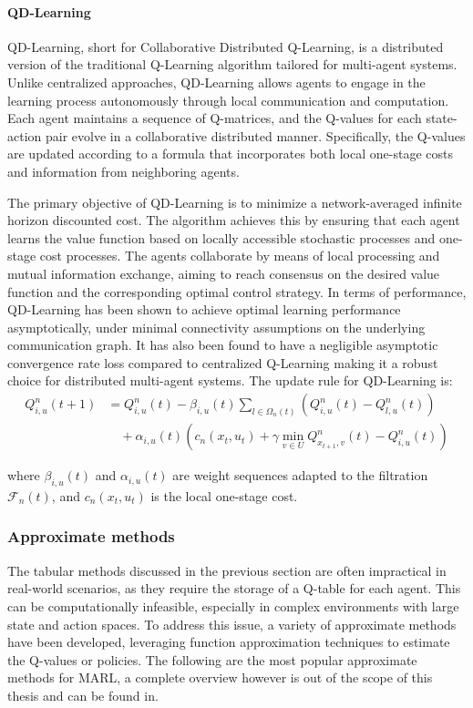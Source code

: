  \paragraph*{QD-Learning}
 QD-Learning, short for Collaborative Distributed Q-Learning, 
  is a distributed version of the traditional Q-Learning algorithm tailored for multi-agent systems. 
%
Unlike centralized approaches, 
 QD-Learning allows agents to engage in the learning process autonomously through local communication and computation.
% 
Each agent maintains a sequence of Q-matrices, 
  and the Q-values for each state-action pair evolve in a collaborative distributed manner. 
%
Specifically, the Q-values are updated according to a formula that incorporates both local one-stage costs 
  and information from neighboring agents.

The primary objective of QD-Learning is to minimize a network-averaged infinite horizon discounted cost. 
%
The algorithm achieves this by ensuring 
 that each agent learns the value function based on locally 
 accessible stochastic processes and one-stage cost processes. 
%
The agents collaborate by means of local processing and mutual information exchange, 
 aiming to reach consensus on the desired value function and the corresponding optimal control strategy.
%
In terms of performance, 
 QD-Learning has been shown to achieve optimal learning performance asymptotically, 
 under minimal connectivity assumptions on the underlying communication graph. 
%
It has also been found to have a negligible asymptotic
 convergence rate loss compared to centralized Q-Learning
 making it a robust choice for distributed multi-agent systems.
The update rule for QD-Learning is:
 \begin{align*}
  Q^n_{i,u}(t+1) &= Q^n_{i,u}(t) - \beta_{i,u}(t) \sum_{l \in \Omega_n(t)} (Q^n_{i,u}(t) - Q^n_{l,u}(t)) \\
  &\quad + \alpha_{i,u}(t) \left( c_n(x_t, u_t) + \gamma \min_{v \in U} Q^n_{x_{t+1},v}(t) - Q^n_{i,u}(t) \right)
  \end{align*}
 
 where \(\beta_{i,u}(t)\) and \(\alpha_{i,u}(t)\) are weight sequences adapted to the filtration \(\mathcal{F}_{n}(t)\), and \(c_{n}(x_{t}, u_{t})\) is the local one-stage cost.

\subsubsection{Approximate methods}
The tabular methods discussed in the previous section are often impractical in real-world scenarios, 
 as they require the storage of a Q-table for each agent. 
 This can be computationally infeasible, 
 especially in complex environments with large state and action spaces.
%
To address this issue, 
 a variety of approximate methods have been developed, 
 leveraging function approximation techniques to estimate the Q-values or policies.
%
The following are the most popular approximate methods for MARL, a complete overview however is out of the scope of this thesis and can be found in. %
